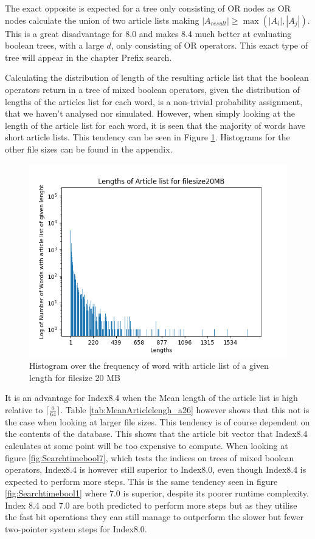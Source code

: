 The exact opposite is expected for a tree only consisting of OR nodes as OR nodes calculate the union of two article lists making $|A_{result}|\geq \max(|A_i|,|A_j|)$. This is a great disadvantage for 8.0 and makes 8.4 much better at evaluating boolean trees, with a large $d$, only consisting of OR operators. This exact type of tree will appear in the chapter Prefix search.

Calculating the distribution of length of the resulting article list that the boolean operators return in a tree of mixed boolean operators, given the distribution of lengths of the articles list for each word, is a non-trivial probability assignment, that we haven't analysed nor simulated. However, when simply looking at the length of the article list for each word, it is seen that the majority of words have short article lists. This tendency can be seen in Figure \ref{fig:Articlelength20}. Histograms for the other file sizes can be found in the appendix.

\begin{figure}[ht!]
    \centering
    \includegraphics[width=.7\textwidth]{LaTeX/Pictures/Results/ArticleLengthg20MB.png}
    \caption{Histogram over the frequency of word with article list of a given length for filesize 20 MB}
    \label{fig:Articlelength20}
\end{figure}

It is an advantage for Index8.4 when the Mean length of the article list is high relative to $\lceil \frac{a}{64} \rceil$. Table \ref{tab:MeanArticlelengh_a26} however shows that this not is the case when looking at larger file sizes. This tendency is of course dependent on the contents of the database. This shows that the article bit vector that Index8.4 calculates at some point will be too expensive to compute. When looking at figure \ref{fig:Searchtimebool7}, which tests the indices on trees of mixed boolean operators, Index8.4 is however still superior to Index8.0, even though Index8.4 is expected to perform more steps. This is the same tendency seen in figure \ref{fig:Searchtimebool1} where 7.0 is superior, despite its poorer runtime complexity. Index 8.4 and 7.0 are both predicted to perform more steps but as they utilise the fast bit operations they can still manage to outperform the slower but fewer two-pointer system steps for Index8.0. 

